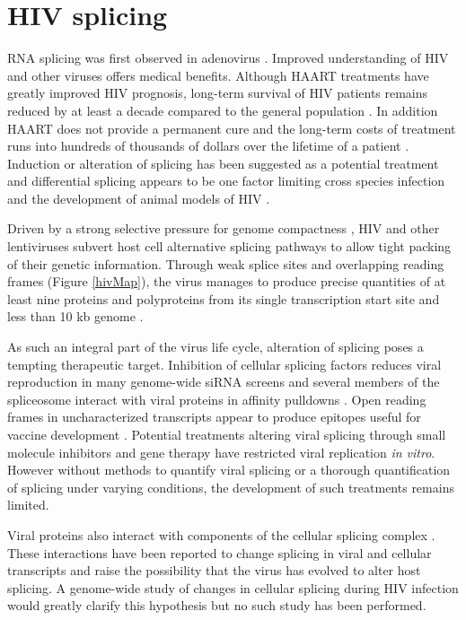 \documentclass[../sherrill-Mix_thesis.tex]{subfiles}
\begin{document}
\section{HIV splicing}
	RNA splicing was first observed in adenovirus \citep{Berget1977,Chow1977}. Improved understanding of HIV and other viruses offers medical benefits. Although HAART treatments have greatly improved HIV prognosis, long-term survival of HIV patients remains reduced by at least a decade compared to the general population \citep{Lohse2007}. In addition HAART does not provide a permanent cure \citep{Richman2009} and the long-term costs of treatment runs into hundreds of thousands of dollars over the lifetime of a patient \citep{Hutchinson2006,Schackman2006}.  Induction or alteration of splicing has been suggested as a potential treatment \citep{Fukuhara2006,Mandal2010} and differential splicing appears to be one factor limiting cross species infection and the development of animal models of HIV \citep{Zheng2003}. 

	Driven by a strong selective pressure for genome compactness \citep{Gelinas1986,Herman1987,Shin2000}, HIV and other lentiviruses subvert host cell alternative splicing pathways to allow tight packing of their genetic information. Through weak splice sites and overlapping reading frames (Figure \ref{hivMap}), the virus manages to produce precise quantities of at least nine proteins and polyproteins from its single transcription start site and less than 10 kb genome \citep{Stoltzfus2009}. 

	As such an integral part of the virus life cycle\citep{Kim1989,Pomerantz1990}, alteration of splicing poses a tempting therapeutic target. Inhibition of cellular splicing factors reduces viral reproduction in many genome-wide siRNA screens \citep{Brass2008,Konig2008,Bushman2009} and several members of the spliceosome interact with viral proteins in affinity pulldowns \citep{Jager2012}. Open reading frames in uncharacterized transcripts appear to produce epitopes useful for vaccine development \citep{Bansal2010}. Potential treatments altering viral splicing through small molecule inhibitors \citep{Fukuhara2006,Bakkour2007} and gene therapy \citep{Asparuhova2007,Mandal2010} have restricted viral replication \emph{in vitro}. However without methods to quantify viral splicing or a thorough quantification of splicing under varying conditions, the development of such treatments remains limited. 

	Viral proteins also interact with components of the cellular splicing complex \citep{Tange1996,Berro2006,Jager2012}. These interactions have been reported to change splicing in viral\citep{Berro2006,Bohne2007,Jablonski2010} and cellular transcripts \citep{Kuramitsu2005,Hashizume2007} and raise the possibility that the virus has evolved to alter host splicing. A genome-wide study of changes in cellular splicing during HIV infection would greatly clarify this hypothesis but no such study has been performed. 
\end{document}
